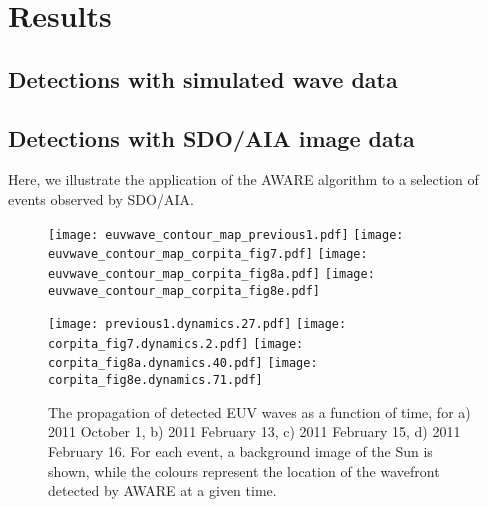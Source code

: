 \section{Results}\label{sec:results}

\subsection{Detections with simulated wave data}

\subsection{Detections with SDO/AIA image data}

Here, we illustrate the application of the AWARE algorithm to a selection of events observed by SDO/AIA.

\begin{figure}
\begin{center}
\texttt{[image: euvwave\_contour\_map\_previous1.pdf]}
\texttt{[image: euvwave\_contour\_map\_corpita\_fig7.pdf]}
\texttt{[image: euvwave\_contour\_map\_corpita\_fig8a.pdf]}
\texttt{[image: euvwave\_contour\_map\_corpita\_fig8e.pdf]}

\texttt{[image: previous1.dynamics.27.pdf]}
\texttt{[image: corpita\_fig7.dynamics.2.pdf]}
\texttt{[image: corpita\_fig8a.dynamics.40.pdf]}
\texttt{[image: corpita\_fig8e.dynamics.71.pdf]}
\caption{The propagation of detected EUV waves as a function of time, for a) 2011 October 1, b) 2011 February 13, c) 2011 February 15, d) 2011 February 16. For each event, a background image of the Sun is shown, while the colours represent the location of the wavefront detected by AWARE at a given time.}
\end{center}
\end{figure}




